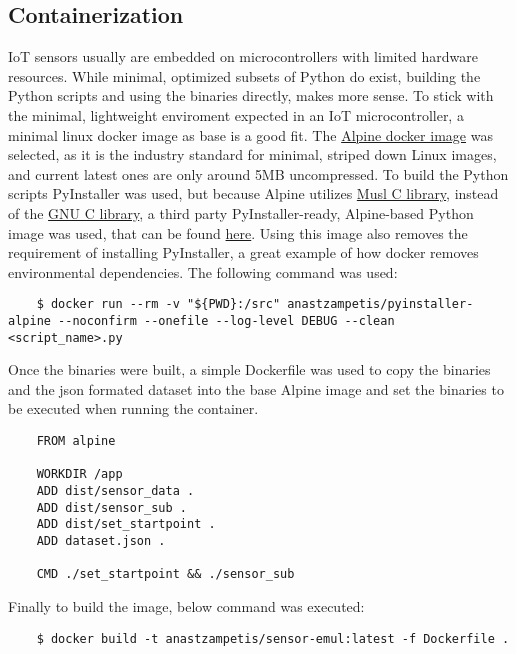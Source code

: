 \subsection{Containerization}
IoT sensors usually are embedded on microcontrollers with limited hardware resources. While minimal, optimized subsets of Python do exist, building the Python scripts and using the binaries directly, makes more sense. To stick with the minimal, lightweight enviroment expected in an IoT microcontroller, a minimal linux docker image as base is a good fit. The \href{https://hub.docker.com/_/alpine/}{Alpine docker image} was selected, as it is the industry standard for minimal, striped down Linux images, and current latest ones are only around 5MB uncompressed. To build the Python scripts PyInstaller was used, but because Alpine utilizes \href{https://musl.libc.org/}{Musl C library}, instead of the \href{https://www.gnu.org/software/libc/}{GNU C library}, a third party PyInstaller-ready, Alpine-based Python image was used, that can be found \href{https://github.com/six8/pyinstaller-alpine}{here}. Using this image also removes the requirement of installing PyInstaller, a great example of how docker removes environmental dependencies. The following command was used:
\begin{verbatim}
    $ docker run --rm -v "${PWD}:/src" anastzampetis/pyinstaller-alpine --noconfirm --onefile --log-level DEBUG --clean <script_name>.py
\end{verbatim}
Once the binaries were built, a simple Dockerfile was used to copy the binaries and the json formated dataset into the base Alpine image and set the binaries to be executed when running the container.
\begin{verbatim}
    FROM alpine

    WORKDIR /app
    ADD dist/sensor_data .
    ADD dist/sensor_sub .
    ADD dist/set_startpoint .
    ADD dataset.json .

    CMD ./set_startpoint && ./sensor_sub
\end{verbatim}  
Finally to build the image, below command was executed:
\begin{verbatim}
    $ docker build -t anastzampetis/sensor-emul:latest -f Dockerfile .
\end{verbatim}

